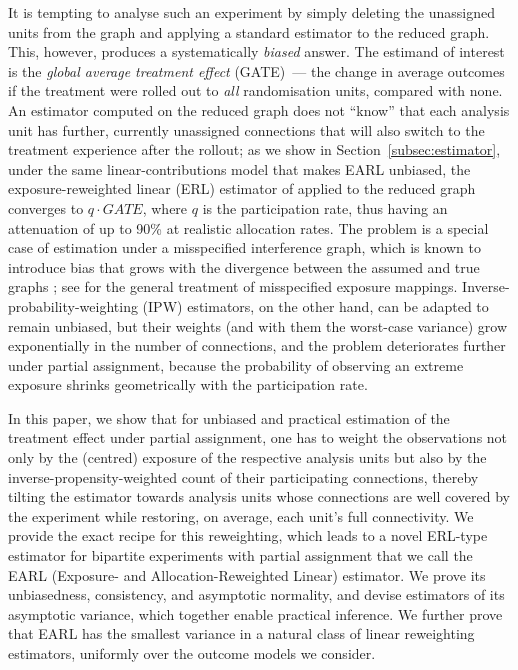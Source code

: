 \documentclass[sigconf]{acmart}
\begin{document}
It is tempting to analyse such an experiment by simply deleting the unassigned units from the graph and applying a standard estimator to the reduced graph. This, however, produces a systematically \emph{biased} answer. The estimand of interest is the \emph{global average treatment effect} (GATE)~--- the change in average outcomes if the treatment were rolled out to \emph{all} randomisation units, compared with none. An estimator computed on the reduced graph does not ``know'' that each analysis unit has further, currently unassigned connections that will also switch to the treatment experience after the rollout; as we show in Section~\ref{subsec:estimator}, under the same linear-contributions model that makes EARL unbiased, the exposure-reweighted linear (ERL) estimator of \citet{harshaw2023erl} applied to the reduced graph converges to $q\cdot GATE$, where $q$ is the participation rate, thus having an attenuation of up to 90\% at realistic allocation rates. The problem is a special case of estimation under a misspecified interference graph, which is known to introduce bias that grows with the divergence between the assumed and true graphs \cite{weinstein2026causal}; see \cite{savje2024misspecified} for the general treatment of misspecified exposure mappings. Inverse-probability-weighting (IPW) estimators, on the other hand, can be adapted to remain unbiased, but their weights (and with them the worst-case variance) grow exponentially in the number of connections, and the problem deteriorates further under partial assignment, because the probability of observing an extreme exposure shrinks geometrically with the participation rate.

In this paper, we show that for unbiased and practical estimation of the treatment effect under partial assignment, one has to weight the observations not only by the (centred) exposure of the respective analysis units but also by the inverse-propensity-weighted count of their participating connections, thereby tilting the estimator towards analysis units whose connections are well covered by the experiment while restoring, on average, each unit's full connectivity. We provide the exact recipe for this reweighting, which leads to a novel ERL-type estimator for bipartite experiments with partial assignment that we call the EARL (Exposure- and Allocation-Reweighted Linear) estimator. We prove its unbiasedness, consistency, and asymptotic normality, and devise estimators of its asymptotic variance, which together enable practical inference. We further prove that EARL has the smallest variance in a natural class of linear reweighting estimators, uniformly over the outcome models we consider.
\end{document}
